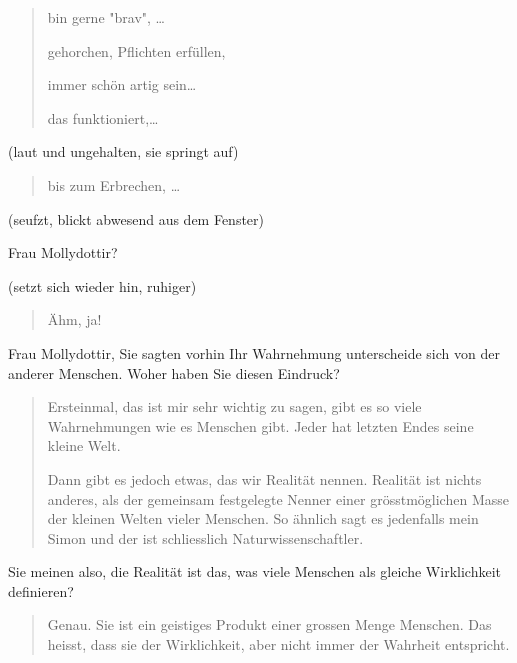 \documentclass[10pt,titlepage,a5paper]{book}
\newenvironment{tg}{\begin{quote}\em}{\end{quote}}
\begin{document}
 \begin{tg}
 
 bin gerne "brav", \dots 
 
 gehorchen, Pflichten erfüllen, 
 
 immer schön artig sein\dots
 
 das funktioniert,\dots
 
 \end{tg}
 
 (laut und ungehalten, sie springt auf)
 
 \begin{tg}
 
 bis zum Erbrechen, \dots 
 

 \end{tg}
 
 (seufzt, blickt abwesend aus dem Fenster)
 
 Frau Mollydottir?
 
 (setzt sich wieder hin, ruhiger)
 
 \begin{tg}
 
 Ähm, ja!
 
 \end{tg}
 
 Frau Mollydottir, Sie sagten vorhin Ihr Wahrnehmung unterscheide sich von der anderer Menschen. Woher haben Sie diesen Eindruck?
 
 \begin{tg}
 
 Ersteinmal, das ist mir sehr wichtig zu sagen, gibt es so viele Wahrnehmungen wie es Menschen gibt. Jeder hat letzten Endes seine kleine Welt.
 
 Dann gibt es jedoch etwas, das wir Realität nennen. Realität ist nichts anderes, als der gemeinsam festgelegte Nenner einer grösstmöglichen Masse der kleinen Welten vieler Menschen. So ähnlich sagt es jedenfalls mein Simon und der ist schliesslich Naturwissenschaftler.
 
 
 \end{tg}
 
 Sie meinen also, die Realität ist das, was viele Menschen als gleiche Wirklichkeit definieren?
 
 \begin{tg}
 
 Genau. Sie ist ein geistiges Produkt einer grossen Menge Menschen. Das heisst, dass sie der Wirklichkeit, aber nicht immer der Wahrheit entspricht.
 
 \end{tg}
 
\end{document}
